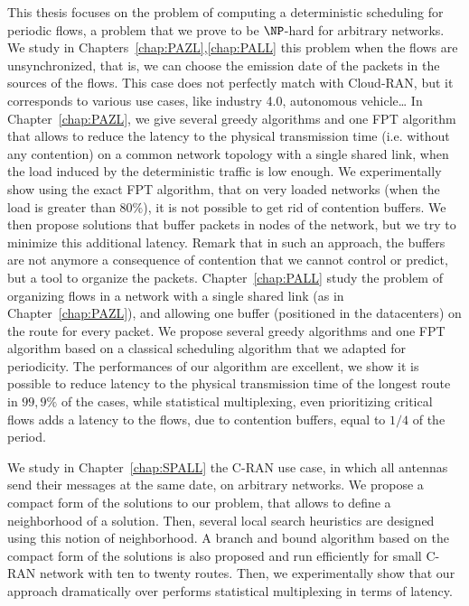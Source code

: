  This thesis focuses on the problem of computing a deterministic scheduling for periodic flows, a problem that we prove to be $\NP$-hard for arbitrary networks.
 We study in Chapters~\ref{chap:PAZL},\ref{chap:PALL} this problem when the flows are unsynchronized, that is, we can choose the emission date of the packets in the sources of the flows. This case does not perfectly match with Cloud-RAN, but it corresponds to various use cases, like industry 4.0, autonomous vehicle\dots
In Chapter~\ref{chap:PAZL}, we give several greedy algorithms and one FPT algorithm that allows to reduce the latency to the physical transmission time (i.e. without any contention) on a common network topology with a single shared link, when the load induced by the deterministic traffic is low enough. We experimentally show using the exact FPT algorithm, that on very loaded networks (when the load is greater than $80\%$), it is not possible to get rid of contention buffers. 
We then propose solutions that buffer packets in nodes of the network, but we try to minimize this additional latency. Remark that in such an approach, the buffers are not anymore a consequence of contention that we cannot control or predict, but a tool to organize the packets.
Chapter~\ref{chap:PALL} study the problem of organizing flows in a network with a single shared link (as in Chapter~\ref{chap:PAZL}), and allowing one buffer (positioned in the datacenters) on the route for every packet. We propose several greedy algorithms and one FPT algorithm based on a classical scheduling algorithm that we adapted for periodicity. The performances of our algorithm are excellent, we show it is possible to reduce latency to the physical transmission time of the longest route in $99,9\%$ of the cases, while statistical multiplexing, even prioritizing critical flows adds a latency to the flows, due to contention buffers, equal to $1/4$ of the period.

We study in Chapter~\ref{chap:SPALL} the C-RAN use case, in which all antennas send their messages at the same date, on arbitrary networks. We propose a compact form of the solutions to our problem, that allows to define a neighborhood of a solution. Then, several local search heuristics are designed using this notion of neighborhood. A branch and bound algorithm based 
on the compact form of the solutions is also proposed and run efficiently for small C-RAN network with ten to twenty routes. Then, we experimentally show that our approach dramatically over performs statistical multiplexing in terms of latency.

